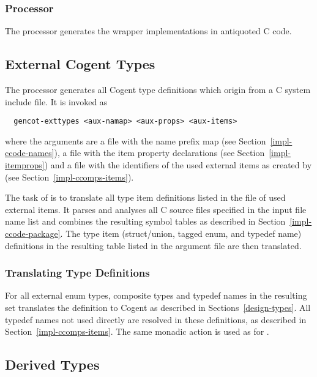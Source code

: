 \subsubsection{Processor }

The processor  generates the wrapper implementations in antiquoted C code.

\subsection{External Cogent Types}
\label{impl-ccomps-exttypes}

The processor  generates all Cogent type definitions which origin from a C system include file.
It is invoked as
\begin{verbatim}
  gencot-exttypes <aux-namap> <aux-props> <aux-items>
\end{verbatim}
where the arguments are a file  with the name prefix map 
(see Section~\ref{impl-ccode-names}), a file  with the item property declarations (see 
Section~\ref{impl-itemprops}) and a file  with the identifiers of the used external items as created 
by  (see Section~\ref{impl-ccomps-items}).

The task of  is to translate all type item definitions listed in the 
file of used external items. It parses and analyses
all C source files specified in the input file name list and combines the resulting symbol tables as
described in Section~\ref{impl-ccode-package}. The type item (struct/union, tagged enum, and typedef name) definitions 
in the resulting table listed in the argument file are then translated.

\subsubsection{Translating Type Definitions}

For all external enum types, composite types and typedef names in the resulting set  translates the
definition to Cogent as described in Sections~\ref{design-types}.
All typedef names not used directly are resolved in these definitions, as described in Section~\ref{impl-ccomps-items}.
The same monadic action  is used as for .

\subsection{Derived Types}
\label{impl-ccomps-dvdtypes}


